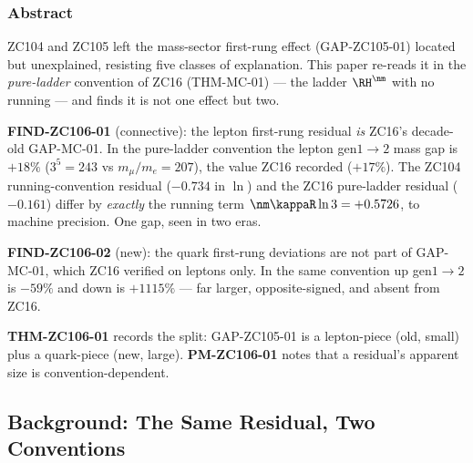 \documentclass[12pt, a4paper]{article}
\begin{document}
\subsubsection*{Abstract}
\sloppy
ZC104 and ZC105 left the mass-sector first-rung effect (GAP-ZC105-01) located but
unexplained, resisting five classes of explanation. This paper re-reads it in the
\emph{pure-ladder} convention of ZC16 (THM-MC-01) --- the ladder $\RH^{\nm}$ with
no running --- and finds it is not one effect but two.

\textbf{FIND-ZC106-01} (connective): the lepton first-rung residual \emph{is}
ZC16's decade-old GAP-MC-01. In the pure-ladder convention the lepton
gen$1{\to}2$ mass gap is $+18\%$ ($3^5=243$ vs $m_\mu/m_e=207$), the value ZC16
recorded ($+17\%$). The ZC104 running-convention residual ($-0.734$ in $\ln$) and
the ZC16 pure-ladder residual ($-0.161$) differ by \emph{exactly} the running
term $\nm\kappaR\ln 3=+0.5726$, to machine precision. One gap, seen in two eras.

\textbf{FIND-ZC106-02} (new): the quark first-rung deviations are not part of
GAP-MC-01, which ZC16 verified on leptons only. In the same convention up
gen$1{\to}2$ is $-59\%$ and down is $+1115\%$ --- far larger, opposite-signed, and
absent from ZC16.

\textbf{THM-ZC106-01} records the split: GAP-ZC105-01 is a lepton-piece (old,
small) plus a quark-piece (new, large). \textbf{PM-ZC106-01} notes that a
residual's apparent size is convention-dependent.


\subsection{Background: The Same Residual, Two Conventions}
\label{sec:background-zc106}
\end{document}

